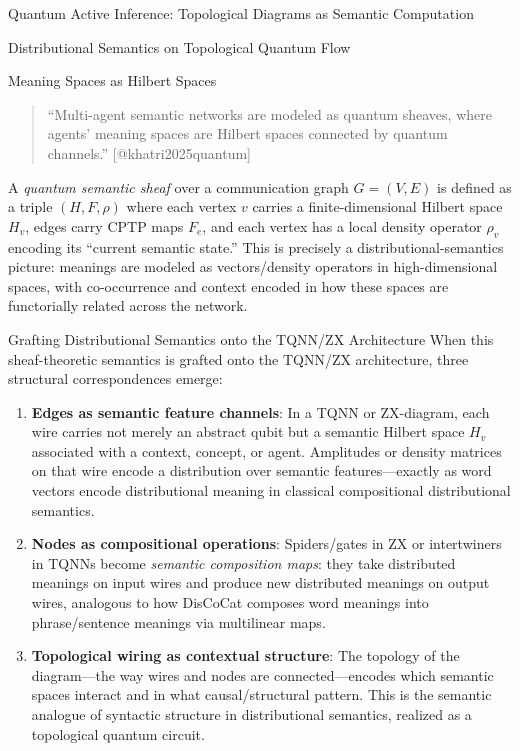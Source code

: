 \documentclass[
  ignorenonframetext,
]{beamer}
\begin{document}
\begin{frame}{Quantum Active Inference: Topological Diagrams as Semantic
Computation}
\begin{block}{Distributional Semantics on Topological Quantum Flow}
\begin{block}{Meaning Spaces as Hilbert Spaces}
\begin{quote}
``Multi-agent semantic networks are modeled as quantum sheaves, where
agents' meaning spaces are Hilbert spaces connected by quantum
channels.'' {[}@khatri2025quantum{]}
\end{quote}

A \emph{quantum semantic sheaf} over a communication graph \(G=(V,E)\)
is defined as a triple \((H,F,\rho)\) where each vertex \(v\) carries a
finite-dimensional Hilbert space \(H_v\), edges carry CPTP maps \(F_e\),
and each vertex has a local density operator \(\rho_v\) encoding its
``current semantic state.'' This is precisely a distributional-semantics
picture: meanings are modeled as vectors/density operators in
high-dimensional spaces, with co-occurrence and context encoded in how
these spaces are functorially related across the network.
\end{block}

\begin{block}{Grafting Distributional Semantics onto the TQNN/ZX
Architecture}
\protect{}\label{grafting-distributional-semantics-onto-the-tqnnzx-architecture}
When this sheaf-theoretic semantics is grafted onto the TQNN/ZX
architecture, three structural correspondences emerge:

\begin{enumerate}
\item
  \textbf{Edges as semantic feature channels}: In a TQNN or ZX-diagram,
  each wire carries not merely an abstract qubit but a semantic Hilbert
  space \(H_v\) associated with a context, concept, or agent. Amplitudes
  or density matrices on that wire encode a distribution over semantic
  features---exactly as word vectors encode distributional meaning in
  classical compositional distributional semantics.
\item
  \textbf{Nodes as compositional operations}: Spiders/gates in ZX or
  intertwiners in TQNNs become \emph{semantic composition maps}: they
  take distributed meanings on input wires and produce new distributed
  meanings on output wires, analogous to how DisCoCat composes word
  meanings into phrase/sentence meanings via multilinear maps.
\item
  \textbf{Topological wiring as contextual structure}: The topology of
  the diagram---the way wires and nodes are connected---encodes which
  semantic spaces interact and in what causal/structural pattern. This
  is the semantic analogue of syntactic structure in distributional
  semantics, realized as a topological quantum circuit.
\end{enumerate}


\end{block}
\end{block}
\end{frame}
\end{document}
